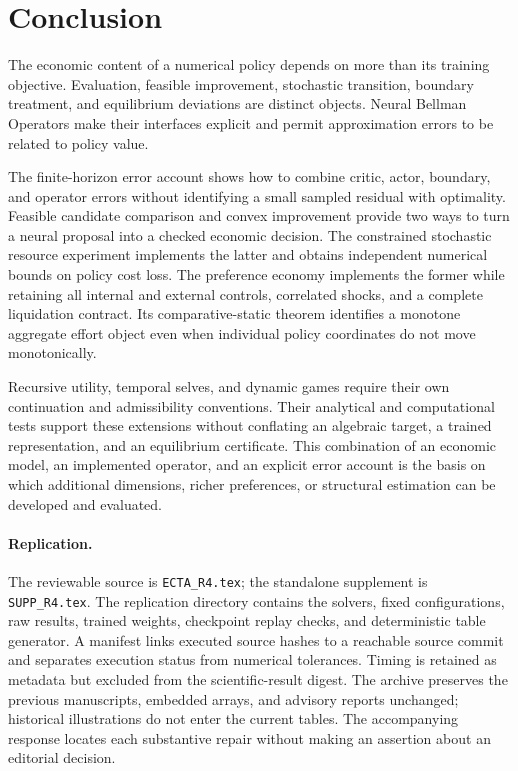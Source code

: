 \section{Conclusion}
The economic content of a numerical policy depends on more than its training objective. Evaluation, feasible improvement, stochastic transition, boundary treatment, and equilibrium deviations are distinct objects. Neural Bellman Operators make their interfaces explicit and permit approximation errors to be related to policy value.

The finite-horizon error account shows how to combine critic, actor, boundary, and operator errors without identifying a small sampled residual with optimality. Feasible candidate comparison and convex improvement provide two ways to turn a neural proposal into a checked economic decision. The constrained stochastic resource experiment implements the latter and obtains independent numerical bounds on policy cost loss. The preference economy implements the former while retaining all internal and external controls, correlated shocks, and a complete liquidation contract. Its comparative-static theorem identifies a monotone aggregate effort object even when individual policy coordinates do not move monotonically.

Recursive utility, temporal selves, and dynamic games require their own continuation and admissibility conventions. Their analytical and computational tests support these extensions without conflating an algebraic target, a trained representation, and an equilibrium certificate. This combination of an economic model, an implemented operator, and an explicit error account is the basis on which additional dimensions, richer preferences, or structural estimation can be developed and evaluated.

\paragraph{Replication.}
The reviewable source is \texttt{ECTA\_R4.tex}; the standalone supplement is \texttt{SUPP\_R4.tex}. The replication directory contains the solvers, fixed configurations, raw results, trained weights, checkpoint replay checks, and deterministic table generator. A manifest links executed source hashes to a reachable source commit and separates execution status from numerical tolerances. Timing is retained as metadata but excluded from the scientific-result digest. The archive preserves the previous manuscripts, embedded arrays, and advisory reports unchanged; historical illustrations do not enter the current tables. The accompanying response locates each substantive repair without making an assertion about an editorial decision.
